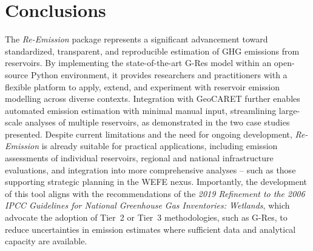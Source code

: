 \documentclass[final,1p,times]{elsarticle}
\begin{document}

\section{Conclusions}
\label{sec:conclusions}

The \emph{Re-Emission} package represents a significant advancement toward standardized, transparent, and reproducible estimation of \acl{GHG} emissions from reservoirs.
By implementing the state-of-the-art G-Res model within an open-source Python environment, it provides researchers and practitioners with a flexible platform to apply, extend, and experiment with reservoir emission modelling across diverse contexts.
Integration with GeoCARET further enables automated emission estimation with minimal manual input, streamlining large-scale analyses of multiple reservoirs, as demonstrated in the two case studies presented.
Despite current limitations and the need for ongoing development, \emph{Re-Emission} is already suitable for practical applications, including emission assessments of individual reservoirs, regional and national infrastructure evaluations, and integration into more comprehensive analyses -- such as those supporting strategic planning in the \ac{WEFE} nexus.
Importantly, the development of this tool aligns with the recommendations of the \emph{2019 Refinement to the 2006 \acs{IPCC} Guidelines for National Greenhouse Gas Inventories: Wetlands}\cite{IPCC2019}, which advocate the adoption of Tier~2 or Tier~3 methodologies, such as G-Res, to reduce uncertainties in emission estimates where sufficient data and analytical capacity are available.
\end{document}
